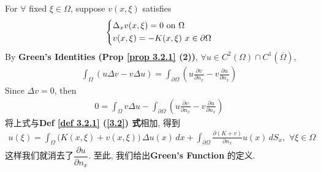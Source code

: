 	\hspace{-1.95em}For $\forall$ fixed $\xi \in \Omega$, suppose $v(x , \xi)$ satisfies
	\begin{align*}
		\begin{dcases*}
			\Delta_x v(x , \xi) = 0 \,\, \text{on} \,\, \Omega \\
			v(x , \xi) = - K(x , \xi) \,\, x \in \partial \Omega
		\end{dcases*}
	\end{align*}
	By \textbf{Green's Identities (Prop \ref{prop 3.2.1} (2))}, $\forall u \in C^2(\Omega) \cap C^1\left( \overline{\Omega} \right)$, 
	\begin{align*}
		\int_{\Omega} (u \Delta v - v \Delta u) 
		= \int_{\partial \Omega} \left( u \frac{\partial v}{\partial n_x} - v \frac{\partial u}{\partial n_x} \right)
	\end{align*}
	Since $\Delta v = 0$, then
	\begin{align*}
		0 
		= \int_{\Omega} v \Delta u - \int_{\partial \Omega} \left( u \frac{\partial v}{\partial n_x} - v \frac{\partial u}{\partial n_x} \right)
	\end{align*}
	将上式与\textbf{Def \ref{def 3.2.1} (\ref{3.2}) 式}相加, 得到
	\begin{align*}
		u(\xi) 
		= \int_{\Omega} \Big( K(x , \xi) + v(x , \xi) \Big) \, \Delta u(x) \, dx 
		+ \int_{\partial \Omega} \frac{\partial (K + v)}{\partial n_x} u(x) \, dS_x , \,\, \forall \xi \in \Omega
	\end{align*}
	这样我们就消去了$\dfrac{\partial u}{\partial n_x}$. 至此, 我们给出\textbf{Green's Function} 的定义. 
	
	\newpage
	
